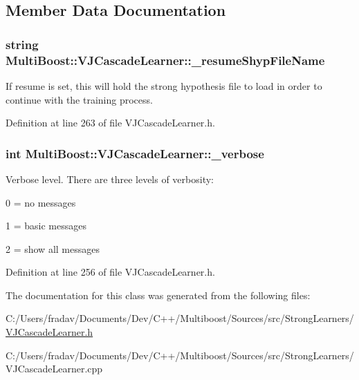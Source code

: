 \subsection{Member Data Documentation}
\hypertarget{classMultiBoost_1_1VJCascadeLearner_af2753ac93b04cd7d77dd584c93a5fe89}{
\subsubsection[{\-\_\-resume\-Shyp\-File\-Name}]{\setlength{\rightskip}{0pt plus 5cm}string Multi\-Boost\-::\-V\-J\-Cascade\-Learner\-::\-\_\-resume\-Shyp\-File\-Name\hspace{0.3cm}{\ttfamily [protected]}}}\label{classMultiBoost_1_1VJCascadeLearner_af2753ac93b04cd7d77dd584c93a5fe89}
If resume is set, this will hold the strong hypothesis file to load in order to continue with the training process. 

Definition at line 263 of file V\-J\-Cascade\-Learner.\-h.

\hypertarget{classMultiBoost_1_1VJCascadeLearner_a28381536dfa8fd6b11993902a5b16bea}{
\subsubsection[{\-\_\-verbose}]{\setlength{\rightskip}{0pt plus 5cm}int Multi\-Boost\-::\-V\-J\-Cascade\-Learner\-::\-\_\-verbose\hspace{0.3cm}{\ttfamily [protected]}}}\label{classMultiBoost_1_1VJCascadeLearner_a28381536dfa8fd6b11993902a5b16bea}
Verbose level. There are three levels of verbosity\-:
\begin{DoxyItemize}
\item 0 = no messages
\item 1 = basic messages
\item 2 = show all messages 
\end{DoxyItemize}

Definition at line 256 of file V\-J\-Cascade\-Learner.\-h.



The documentation for this class was generated from the following files\-:\begin{DoxyCompactItemize}
\item 
C\-:/\-Users/fradav/\-Documents/\-Dev/\-C++/\-Multiboost/\-Sources/src/\-Strong\-Learners/\hyperlink{VJCascadeLearner_8h}{V\-J\-Cascade\-Learner.\-h}\item 
C\-:/\-Users/fradav/\-Documents/\-Dev/\-C++/\-Multiboost/\-Sources/src/\-Strong\-Learners/V\-J\-Cascade\-Learner.\-cpp\end{DoxyCompactItemize}
